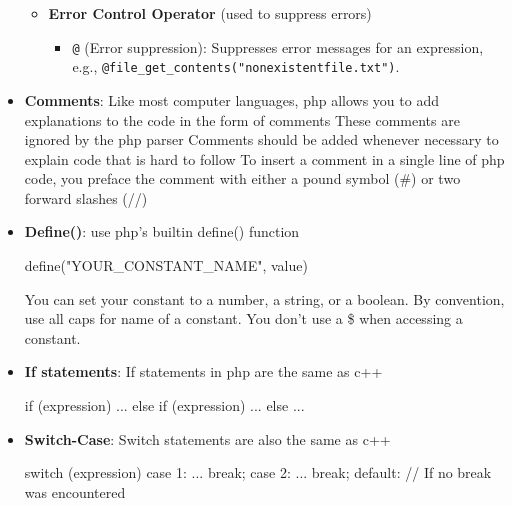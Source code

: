 \documentclass{report}
\begin{document}
\begin{itemize}
\begin{itemize}
                \item \textbf{Error Control Operator} (used to suppress errors)
                    \begin{itemize}
                        \item \texttt{@} (Error suppression): Suppresses error messages for an expression, e.g., \texttt{@file\_get\_contents("nonexistentfile.txt")}.
                    \end{itemize}
            \end{itemize}
        \item \textbf{Comments}: Like most computer languages, php allows you to add explanations to the code in the form of comments
            These comments are ignored by the php parser
            \bigbreak \noindent 
            Comments should be added whenever necessary to explain code that is hard to follow
            \bigbreak \noindent 
            To insert a comment in a single line of php code, you preface the comment with either a pound symbol (\#) or two forward slashes (//)
        \item \textbf{Define()}:
            use php's builtin define() function
            \bigbreak \noindent 
            \begin{bashcode}
                define("YOUR_CONSTANT_NAME", value)
            \end{bashcode}
            You can set your constant to a number, a string, or a boolean.
            \bigbreak \noindent 
            By convention, use all caps for name of a constant.
            \bigbreak \noindent 
            You don't use a \$ when accessing a constant.
        \item \textbf{If statements}: If statements in php are the same as c++
            \bigbreak \noindent 
            \begin{bashcode}
                if (expression) {
                    ...
                } else if (expression) {
                    ...
                } else {
                    ...
                }
            \end{bashcode}
        \item \textbf{Switch-Case}: Switch statements are also the same as c++
            \bigbreak \noindent 
            \begin{bashcode}
                switch (expression) {
                    case 1:
                        ...
                        break;
                    case 2: 
                        ...
                        break;
                    default: // If no break was encountered
}
\end{bashcode}
\end{itemize}
\end{document}
